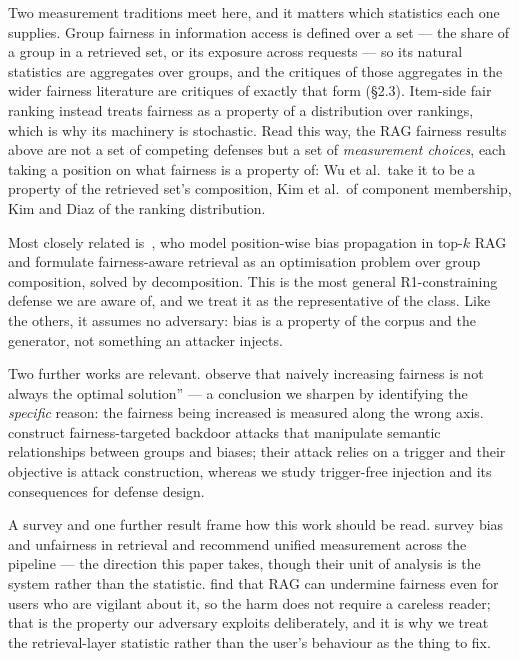 \documentclass[authoryear,review,3p,times]{elsarticle}
\begin{document}
Two measurement traditions meet here, and it matters which statistics each one supplies. Group fairness in information access is defined over a set --- the share of a group in a retrieved set, or its exposure across requests --- so its natural statistics are aggregates over groups, and the critiques of those aggregates in the wider fairness literature are critiques of exactly that form (§2.3). Item-side fair ranking instead treats fairness as a property of a distribution over rankings, which is why its machinery is stochastic. Read this way, the RAG fairness results above are not a set of competing defenses but a set of \emph{measurement choices}, each taking a position on what fairness is a property of: Wu et al.~take it to be a property of the retrieved set's composition, Kim et al.~of component membership, Kim and Diaz of the ranking distribution.

Most closely related is~\citet{zhao2026}, who model position-wise bias propagation in top-\(k\) RAG and formulate fairness-aware retrieval as an optimisation problem over group composition, solved by decomposition. This is the most general R1-constraining defense we are aware of, and we treat it as the representative of the class. Like the others, it assumes no adversary: bias is a property of the corpus and the generator, not something an attacker injects.

Two further works are relevant. \citet{kim2025a} observe that \texttt{}naively increasing fairness is not always the optimal solution'' --- a conclusion we sharpen by identifying the \emph{specific} reason: the fairness being increased is measured along the wrong axis. \citet{bagwe2025} construct fairness-targeted backdoor attacks that manipulate semantic relationships between groups and biases; their attack relies on a trigger and their objective is attack construction, whereas we study trigger-free injection and its consequences for defense design.

A survey and one further result frame how this work should be read. \citet{dai2024} survey bias and unfairness in retrieval and recommend unified measurement across the pipeline --- the direction this paper takes, though their unit of analysis is the system rather than the statistic. \citet{hu2024} find that RAG can undermine fairness even for users who are vigilant about it, so the harm does not require a careless reader; that is the property our adversary exploits deliberately, and it is why we treat the retrieval-layer statistic rather than the user's behaviour as the thing to fix.
\end{document}
